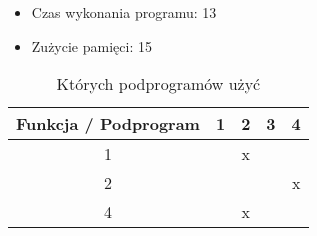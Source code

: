 \documentclass[12pt, a4paper]{article}
\begin{document}
\begin{itemize}
    \item Czas wykonania programu: 13
    \item Zużycie pamięci: 15
\end{itemize}

\begin{table}[H]
\begin{center}
\begin{tabular}{|c|c|c|c|c|}
  \hline
  Funkcja / Podprogram & 1 & 2 & 3 & 4 \\
  \hline
  1 & & x & &  \\
  \hline
  2 &  &  & & x \\
  \hline
  4 &  & x &  &  \\
  \hline
\end{tabular} 
\caption{Których podprogramów użyć}
\end{center}
\end{table}







    
\end{document}
